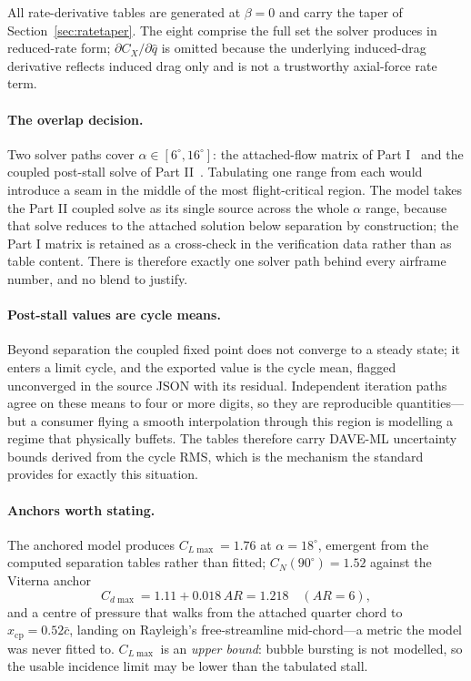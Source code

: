 \documentclass[11pt,a4paper]{article}
\newcommand{\dg}{^\circ}
\begin{document}
All rate-derivative tables are generated at $\beta = 0$ and carry the
taper of Section~\ref{sec:ratetaper}. The eight comprise the full set the
solver produces in reduced-rate form; $\partial C_X/\partial\hat q$ is
omitted because the underlying induced-drag derivative reflects induced
drag only and is not a trustworthy axial-force rate term.

\paragraph{The overlap decision.} Two solver paths cover
$\alpha \in [6\dg, 16\dg]$: the attached-flow matrix of Part
I~\cite{partone} and the coupled post-stall solve of Part
II~\cite{parttwo}. Tabulating one range from each would introduce a seam
in the middle of the most flight-critical region. The model takes the
Part II coupled solve as its single source across the whole $\alpha$
range, because that solve reduces to the attached solution below
separation by construction; the Part I matrix is retained as a
cross-check in the verification data rather than as table content. There
is therefore exactly one solver path behind every airframe number, and no
blend to justify.

\paragraph{Post-stall values are cycle means.} Beyond separation the
coupled fixed point does not converge to a steady state; it enters a
limit cycle, and the exported value is the cycle mean, flagged
unconverged in the source JSON with its residual. Independent iteration
paths agree on these means to four or more digits, so they are
reproducible quantities---but a consumer flying a smooth interpolation
through this region is modelling a regime that physically buffets. The
tables therefore carry DAVE-ML uncertainty bounds derived from the cycle
RMS, which is the mechanism the standard provides for exactly this
situation.

\paragraph{Anchors worth stating.} The anchored model produces
$C_{L\max} = 1.76$ at $\alpha = 18\dg$, emergent from the computed
separation tables rather than fitted; $C_N(90\dg) = 1.52$ against the
Viterna anchor
\begin{equation}
C_{d\max} = 1.11 + 0.018\,A\!R = 1.218 \quad (A\!R = 6),
\end{equation}
and a centre of pressure that walks from the attached quarter chord to
$x_{\mathrm{cp}} = 0.52\bar c$, landing on Rayleigh's free-streamline
mid-chord---a metric the model was never fitted to. $C_{L\max}$ is an
\emph{upper bound}: bubble bursting is not modelled, so the usable
incidence limit may be lower than the tabulated stall.
\end{document}
